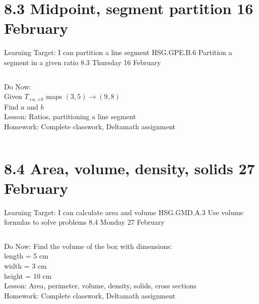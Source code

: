 \section{8.3 Midpoint, segment partition \hfill 16 February \,}
\begin{frame}{Learning Target: I can partition a line segment}
  {HSG.GPE.B.6 Partition a segment in a given ratio \hfill \alert{8.3 Thursday 16 February}}
  \begin{columns}
    Do Now: \\Given $T_{+a,+b}$ maps $(3,5) \rightarrow (9,8)$ \\
    Find $a$ and $b$ \\[0.5cm]
    Lesson: Ratios, partitioning a line segment \\
    Homework: Complete classwork, Deltamath assignment
    \begin{flushright}
    \end{flushright}
  \end{columns}
\end{frame}

\section{8.4 Area, volume, density, solids \hfill 27 February \,}
\begin{frame}{Learning Target: I can calculate area and volume}
  {HSG.GMD.A.3 Use volume formulas to solve problems \hfill \alert{8.4 Monday 27 February}}
  \begin{columns}
    Do Now: Find the volume of the box with dimensions: \\
    length = 5 cm \\
    width = 3 cm\\
    height = 10 cm \\[0.5cm]
    Lesson: Area, perimeter, volume, density, solids, cross sections \\
    Homework: Complete classwork, Deltamath assignment
    \begin{flushright}
    \end{flushright}
  \end{columns}
\end{frame}

